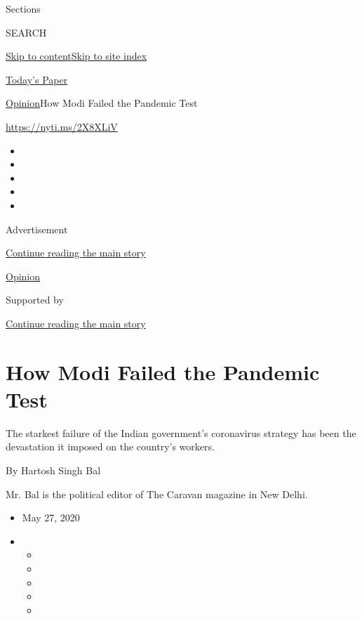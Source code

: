 Sections

SEARCH

\protect\hyperlink{site-content}{Skip to
content}\protect\hyperlink{site-index}{Skip to site index}

\href{https://myaccount.nytimes.com/auth/login?response_type=cookie\&client_id=vi}{}

\href{https://www.nytimes.com/section/todayspaper}{Today's Paper}

\href{/section/opinion}{Opinion}\textbar{}How Modi Failed the Pandemic
Test

\url{https://nyti.ms/2X8XLiV}

\begin{itemize}
\item
\item
\item
\item
\item
\end{itemize}

Advertisement

\protect\hyperlink{after-top}{Continue reading the main story}

\href{/section/opinion}{Opinion}

Supported by

\protect\hyperlink{after-sponsor}{Continue reading the main story}

\hypertarget{how-modi-failed-the-pandemic-test}{%
\section{How Modi Failed the Pandemic
Test}\label{how-modi-failed-the-pandemic-test}}

The starkest failure of the Indian government's coronavirus strategy has
been the devastation it imposed on the country's workers.

By Hartosh Singh Bal

Mr. Bal is the political editor of The Caravan magazine in New Delhi.

\begin{itemize}
\item
  May 27, 2020
\item
  \begin{itemize}
  \item
  \item
  \item
  \item
  \item
  \end{itemize}
\end{itemize}

